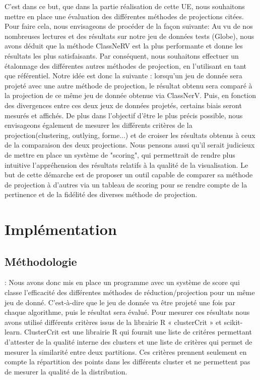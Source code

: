 \medskip
C'est dans ce but, que dans la partie réalisation de cette UE, nous souhaitons mettre en place une évaluation des différentes méthodes de projections citées.
Pour faire cela, nous envisageons de procéder de la façon suivante: \newline
Au vu de nos nombreuses lectures et  des résultats sur notre jeu de données tests (Globe), nous avons déduit que la méthode ClassNeRV est la plus performante et donne les résultats les plus satisfaisants. 
Par conséquent, nous souhaitons effectuer un étalonnage des différentes autres méthodes de projection, en l'utilisant en tant que référentiel. \newline
Notre idée est donc la suivante : lorsqu'un jeu de donnée sera projeté avec une autre méthode de projection, 
le résultat obtenu sera comparé à la projection de ce même jeu de donnée obtenue via ClassNerV.
Puis, en fonction des divergences entre ces deux jeux de données projetés, certains biais seront mesurés et affichés.
De plus dans l'objectif d'être le plus précis possible, nous envisageons également de mesurer les différents critères de la projection(clustering, outlying, forme...) et de croiser les résultats obtenus à ceux de la comparaison des deux projections.
Nous pensons aussi qu'il serait judicieux de mettre en place un système de "scoring", qui permettrait de rendre plus intuitive l'appréhension des résultats relatifs à la qualité de la visualisation. 
\newline 
Le but de cette démarche est de proposer un outil capable de comparer sa méthode de projection à d'autres via un tableau de scoring pour se rendre compte de la pertinence et de la fidélité des diverses méthode de projection.

\medskip


\section{Implémentation}

\subsection{Méthodologie} : 
Nous avons donc mis en place un programme avec un système de score qui classe l’efficacité des différentes méthodes de réduction/projection pour un même jeu de donné. 
C’est-à-dire que le jeu de donnée va être projeté une fois par chaque algorithme, puis le résultat sera évalué.
Pour mesurer ces résultats nous avons utilisé différents critères issus de la librairie R « clusterCrit » et scikit-learn.
ClusterCrit est une librairie R qui fournit une liste de critéres permettant d'attester de la qualité interne des clusters et une liste de critères qui permet 
de mesurer la similarité entre deux partitions. Ces critères prennent seulement en compte la répartition des points dans les différents cluster et ne permettent pas de 
mesurer la qualité de la distribution.

